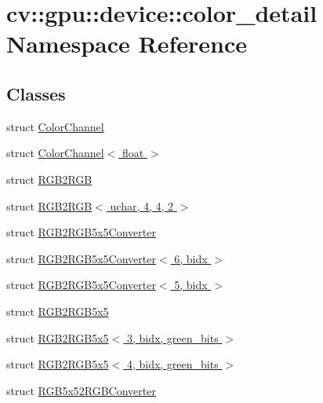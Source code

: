 \hypertarget{namespacecv_1_1gpu_1_1device_1_1color__detail}{\section{cv\-:\-:gpu\-:\-:device\-:\-:color\-\_\-detail Namespace Reference}
\label{namespacecv_1_1gpu_1_1device_1_1color__detail}
}
\subsection*{Classes}
\begin{DoxyCompactItemize}
\item 
struct \hyperlink{structcv_1_1gpu_1_1device_1_1color__detail_1_1ColorChannel}{Color\-Channel}
\item 
struct \hyperlink{structcv_1_1gpu_1_1device_1_1color__detail_1_1ColorChannel_3_01float_01_4}{Color\-Channel$<$ float $>$}
\item 
struct \hyperlink{structcv_1_1gpu_1_1device_1_1color__detail_1_1RGB2RGB}{R\-G\-B2\-R\-G\-B}
\item 
struct \hyperlink{structcv_1_1gpu_1_1device_1_1color__detail_1_1RGB2RGB_3_01uchar_00_014_00_014_00_012_01_4}{R\-G\-B2\-R\-G\-B$<$ uchar, 4, 4, 2 $>$}
\item 
struct \hyperlink{structcv_1_1gpu_1_1device_1_1color__detail_1_1RGB2RGB5x5Converter}{R\-G\-B2\-R\-G\-B5x5\-Converter}
\item 
struct \hyperlink{structcv_1_1gpu_1_1device_1_1color__detail_1_1RGB2RGB5x5Converter_3_016_00_01bidx_01_4}{R\-G\-B2\-R\-G\-B5x5\-Converter$<$ 6, bidx $>$}
\item 
struct \hyperlink{structcv_1_1gpu_1_1device_1_1color__detail_1_1RGB2RGB5x5Converter_3_015_00_01bidx_01_4}{R\-G\-B2\-R\-G\-B5x5\-Converter$<$ 5, bidx $>$}
\item 
struct \hyperlink{structcv_1_1gpu_1_1device_1_1color__detail_1_1RGB2RGB5x5}{R\-G\-B2\-R\-G\-B5x5}
\item 
struct \hyperlink{structcv_1_1gpu_1_1device_1_1color__detail_1_1RGB2RGB5x5_3_013_00_01bidx_00_01green__bits_01_4}{R\-G\-B2\-R\-G\-B5x5$<$ 3, bidx, green\-\_\-bits $>$}
\item 
struct \hyperlink{structcv_1_1gpu_1_1device_1_1color__detail_1_1RGB2RGB5x5_3_014_00_01bidx_00_01green__bits_01_4}{R\-G\-B2\-R\-G\-B5x5$<$ 4, bidx, green\-\_\-bits $>$}
\item 
struct \hyperlink{structcv_1_1gpu_1_1device_1_1color__detail_1_1RGB5x52RGBConverter}{R\-G\-B5x52\-R\-G\-B\-Converter}

\end{DoxyCompactItemize}
